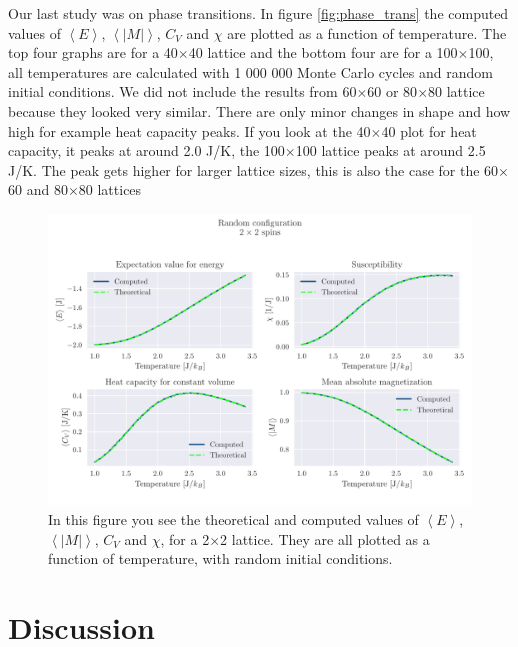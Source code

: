 \documentclass[reprint, english,notitlepage,nofootinbib]{revtex4-1}  %
\begin{document}
Our last study was on phase transitions. In figure \ref{fig:phase_trans} the computed values of $\left<E\right>$, $\left<|M|\right>$, $C_V$ and $\chi$ are plotted as a function of temperature. The top four graphs are for a 40$\times$40 lattice and the bottom four are for a 100$\times$100, all temperatures are calculated with 1 000 000 Monte Carlo cycles and random initial conditions. We did not include the results from 60$\times$60 or 80$\times$80 lattice because they looked very similar. There are only minor changes in shape and how high for example heat capacity peaks. If you look at the 40$\times$40 plot for heat capacity, it peaks at around 2.0 J/K, the 100$\times$100 lattice peaks at around 2.5 J/K. The peak gets higher for larger lattice sizes, this is also the case for the 60$\times$60 and 80$\times$80 lattices

\begin{figure}[!htb]
	\includegraphics[width=\linewidth]{../output/c/L2-T1-dT0_01-NT240-N6-RandomFalse-CompTemp.pdf}
	\caption{In this figure you see the theoretical and computed values of $\left<E\right>$, $\left<|M|\right>$, $C_V$ and $\chi$, for a 2$\times$2 lattice. They are all plotted as a function of temperature, with random initial conditions.}
	\label{fig:L2_Random}
\end{figure}
\section{Discussion}
\end{document}
